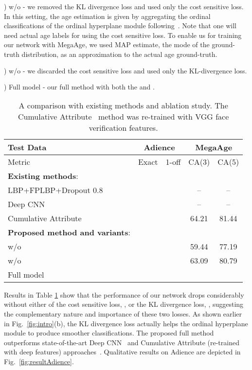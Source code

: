 \documentclass{bmvc2k}
\begin{document}
) w/o  - we removed the KL divergence loss and used only the cost sensitive loss. In this setting, the age estimation is given by aggregating the ordinal classifications of the ordinal hyperplane module following~\cite{chang2011ordinal}. Note that one will need actual age labels for using the cost sensitive loss. To enable us for training our network with MegaAge, we used MAP estimate, the mode of the ground-truth distribution, as an approximation to the actual age ground-truth.

) w/o  - we discarded the cost sensitive loss and used only the  KL-divergence loss.

) Full model - our full method with both the  and .



\begin{table}[t]
\small
\begin{center}
\caption{A comparison with existing methods and ablation study. The Cumulative Attribute~\cite{chen2013cumulative} method was re-trained with VGG face verification features.}
\begin{tabular}{l|cc|cc}
\hline
Test Data & \multicolumn{2}{|c|}{Adience} & \multicolumn{2}{|c}{MegaAge}  \\ \hline
Metric &  Exact & 1-off & CA(3) & CA(5) \\ \hline \hline
\textbf{Existing methods}: &  & & & \\
LBP+FPLBP+Dropout 0.8~\cite{eidinger2014age} &   &  & -- & --  \\
Deep CNN~\cite{levi2015age} &  &  & -- & -- \\   
Cumulative Attribute~\cite{chen2013cumulative} &   &  & 64.21 & 81.44  \\
\hline 
\textbf{Proposed method and variants}: &  & & & \\
w/o  &   &  & 59.44 & 77.19 \\ 
w/o  &  &  & 63.09 & 80.79 \\ 
Full model &  &  &  &   \\  \hline
\end{tabular}
\label{tab:expSupervision}
\end{center}
\end{table}

Results in Table \ref{tab:expSupervision} show that the performance of our network drops considerably without either of the cost sensitive loss, , or the KL divergence loss, , suggesting the complementary nature and importance of these two losses. 
As shown earlier in Fig.~\ref{fig:intro}(b), the KL divergence loss actually helps the ordinal hyperplane module to produce smoother classifications. 
The proposed full method outperforms state-of-the-art Deep CNN~\cite{levi2015age} and Cumulative Attribute (re-trained with deep features) approaches~\cite{chen2013cumulative}.
Qualitative results on Adience are depicted in Fig.~\ref{fig:resultAdience}.
\end{document}
